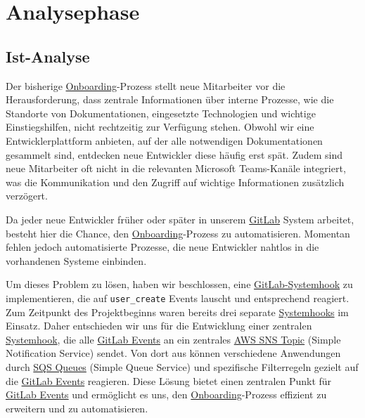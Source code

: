 
\section{Analysephase}
\label{sec:Analysephase}

\subsection{Ist-Analyse}
\label{sec:IstAnalyse}

Der bisherige \hyperlink{Onboarding}{\textcolor{AOBlau}{Onboarding}}-Prozess stellt neue Mitarbeiter vor die Herausforderung, dass zentrale Informationen über interne Prozesse, wie die Standorte von Dokumentationen, eingesetzte Technologien und wichtige Einstiegshilfen, nicht rechtzeitig zur Verfügung stehen. Obwohl wir eine Entwicklerplattform anbieten, auf der alle notwendigen Dokumentationen gesammelt sind, entdecken neue Entwickler diese häufig erst spät. Zudem sind neue Mitarbeiter oft nicht in die relevanten Microsoft Teams-Kanäle integriert, was die Kommunikation und den Zugriff auf wichtige Informationen zusätzlich verzögert.

Da jeder neue Entwickler früher oder später in unserem \hyperlink{GitLab}{\textcolor{AOBlau}{GitLab}} System arbeitet, besteht hier die Chance, den \hyperlink{Onboarding}{\textcolor{AOBlau}{Onboarding}}-Prozess zu automatisieren. Momentan fehlen jedoch automatisierte Prozesse, die neue Entwickler nahtlos in die vorhandenen Systeme einbinden.

Um dieses Problem zu lösen, haben wir beschlossen, eine \hyperlink{GitLabSystemhooks}{\textcolor{AOBlau}{GitLab-Systemhook}} zu implementieren, die auf \texttt{user\_create} Events lauscht und entsprechend reagiert. Zum Zeitpunkt des Projektbeginns waren bereits drei separate \hyperlink{GitLabSystemhooks}{\textcolor{AOBlau}{Systemhooks}} im Einsatz. Daher entschieden wir uns für die Entwicklung einer zentralen \hyperlink{GitLabSystemhooks}{\textcolor{AOBlau}{Systemhook}}, die alle \hyperlink{GitLabEvent}{\textcolor{AOBlau}{GitLab Events}} an ein zentrales \hyperlink{SNS}{\textcolor{AOBlau}{AWS SNS Topic}} (Simple Notification Service) sendet. Von dort aus können verschiedene Anwendungen durch \hyperlink{SQS}{\textcolor{AOBlau}{SQS Queues}} (Simple Queue Service) und spezifische Filterregeln gezielt auf die \hyperlink{GitLabEvent}{\textcolor{AOBlau}{GitLab Events}} reagieren. Diese Lösung bietet einen zentralen Punkt für \hyperlink{GitLabEvent}{\textcolor{AOBlau}{GitLab Events}} und ermöglicht es uns, den \hyperlink{Onboarding}{\textcolor{AOBlau}{Onboarding}}-Prozess effizient zu erweitern und zu automatisieren.


